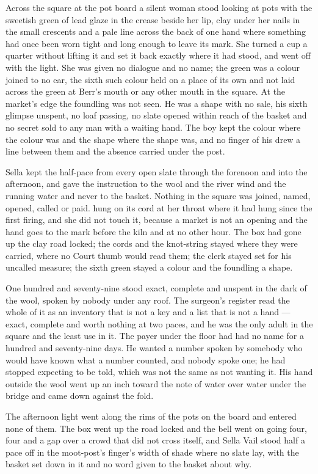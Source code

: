 Across the square at the pot board a silent woman stood looking at pots with the sweetish green of lead glaze in the crease beside her lip, clay under her nails in the small crescents and a pale line across the back of one hand where something had once been worn tight and long enough to leave its mark. She turned a cup a quarter without lifting it and set it back exactly where it had stood, and went off with the light. She was given no dialogue and no name; the green was a colour joined to no ear, the sixth such colour held on a place of its own and not laid across the green at Berr's mouth or any other mouth in the square. At the market's edge the foundling was not seen. He was a shape with no sale, his sixth glimpse unspent, no loaf passing, no slate opened within reach of the basket and no secret sold to any man with a waiting hand. The boy kept the colour where the colour was and the shape where the shape was, and no finger of his drew a line between them and the absence carried under the post.

Sella kept the half-pace from every open slate through the forenoon and into the afternoon, and gave the instruction to the wool and the river wind and the running water and never to the basket. Nothing in the square was joined, named, opened, called or paid.  hung on its cord at her throat where it had hung since the first firing, and she did not touch it, because a market is not an opening and the hand goes to the mark before the kiln and at no other hour. The box had gone up the clay road locked; the cords and the knot-string stayed where they were carried, where no Court thumb would read them; the clerk stayed set for his uncalled measure; the sixth green stayed a colour and the foundling a shape.

One hundred and seventy-nine stood exact, complete and unspent in the dark of the wool, spoken by nobody under any roof. The surgeon's register read the whole of it as an inventory that is not a key and a list that is not a hand --- exact, complete and worth nothing at two paces, and he was the only adult in the square and the least use in it. The payer under the floor had had no name for a hundred and seventy-nine days. He wanted a number spoken by somebody who would have known what a number counted, and nobody spoke one; he had stopped expecting to be told, which was not the same as not wanting it. His hand outside the wool went up an inch toward the note of water over water under the bridge and came down against the fold.

The afternoon light went along the rims of the pots on the board and entered none of them. The box went up the road locked and the bell went on going four, four and a gap over a crowd that did not cross itself, and Sella Vail stood half a pace off in the moot-post's finger's width of shade where no slate lay, with the basket set down in it and no word given to the basket about why.
